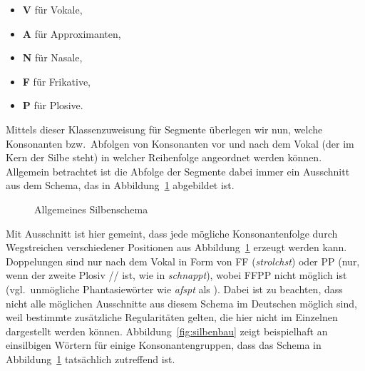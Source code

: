 \begin{itemize}\Lf
  \item \textbf{V} für Vokale,
  \item \textbf{A} für Approximanten,
  \item \textbf{N} für Nasale,
  \item \textbf{F} für Frikative,
  \item \textbf{P} für Plosive.
\end{itemize}

Mittels dieser Klassenzuweisung für Segmente überlegen wir nun, welche Konsonanten bzw.\ Abfolgen von Konsonanten vor und nach dem Vokal (der im Kern der Silbe steht) in welcher Reihenfolge angeordnet werden können.
Allgemein betrachtet ist die Abfolge der Segmente dabei immer ein Ausschnitt aus dem Schema, das in Abbildung~\ref{fig:silbenschema} abgebildet ist.

\begin{figure}[!h]
  \centering
  \caption{Allgemeines Silbenschema}
  \label{fig:silbenschema}
\end{figure}

Mit Ausschnitt ist hier gemeint, dass jede mögliche Konsonantenfolge durch Wegstreichen verschiedener Positionen aus Abbildung~\ref{fig:silbenschema} erzeugt werden kann.
Doppelungen sind nur nach dem Vokal in Form von FF (\textit{strolchst}) oder PP (nur, wenn der zweite Plosiv // ist, wie in \textit{schnappt}), wobei FFPP nicht möglich ist (vgl.\ unmögliche Phantasiewörter wie \textit{\Ast afspt} als \textipa{[afspt]}).
Dabei ist zu beachten, dass nicht alle möglichen Ausschnitte aus diesem Schema im Deutschen möglich sind, weil bestimmte zusätzliche Regularitäten gelten, die hier nicht im Einzelnen dargestellt werden können.
Abbildung~\ref{fig:silbenbau} zeigt beispielhaft an einsilbigen Wörtern für einige Konsonantengruppen, dass das Schema in Abbildung~\ref{fig:silbenschema} tatsächlich zutreffend ist.

